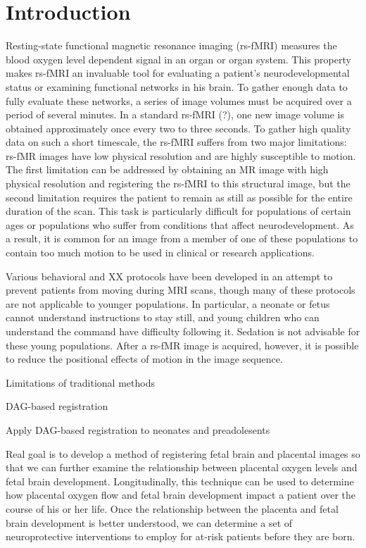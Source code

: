 \chapter{Introduction}

Resting-state functional magnetic resonance imaging (rs-fMRI) measures the blood oxygen level dependent signal in an organ or organ system. This property makes rs-fMRI an invaluable tool for evaluating a patient's neurodevelopmental status or examining functional networks in his brain. To gather enough data to fully evaluate these networks, a series of image volumes must be acquired over a period of several minutes. In a standard rs-fMRI (?), one new image volume is obtained approximately once every two to three seconds. To gather high quality data on such a short timescale, the rs-fMRI suffers from two major limitations: rs-fMR images have low physical resolution and are highly susceptible to motion. The first limitation can be addressed by obtaining an MR image with high physical resolution and registering the rs-fMRI to this structural image, but the second limitation requires the patient to remain as still as possible for the entire duration of the scan. This task is particularly difficult for populations of certain ages or populations who suffer from conditions that affect neurodevelopment. As a result, it is common for an image from a member of one of these populations to contain too much motion to be used in clinical or research applications.

Various behavioral and XX protocols have been developed in an attempt to prevent patients from moving during MRI scans, though many of these protocols are not applicable to younger populations. In particular, a neonate or fetus cannot understand instructions to stay still, and young children who can understand the command have difficulty following it. Sedation is not advisable for these young populations. After a rs-fMR image is acquired, however, it is possible to reduce the positional effects of motion in the image sequence.

Limitations of traditional methods

DAG-based registration

Apply DAG-based registration to neonates and preadolesents

Real goal is to develop a method of registering fetal brain and placental images so that we can further examine the relationship between placental oxygen levels and fetal brain development. Longitudinally, this technique can be used to determine how placental oxygen flow and fetal brain development impact a patient over the course of his or her life. Once the relationship between the placenta and fetal brain development is better understood, we can determine a set of neuroprotective interventions to employ for at-risk patients before they are born.